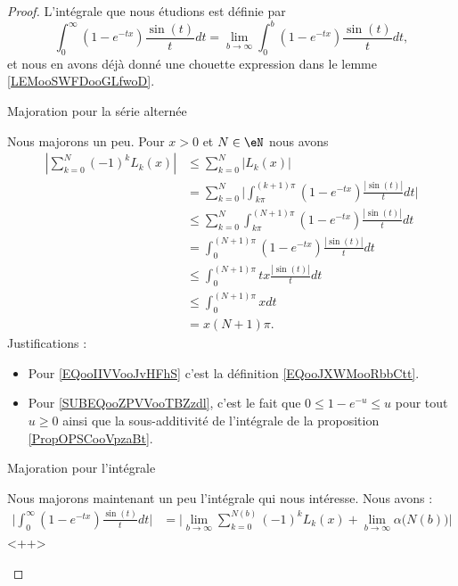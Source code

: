 \begin{proof}
    L'intégrale que nous étudions est définie par
    \begin{equation}
        \int_0^{\infty}(1- e^{-tx})\frac{ \sin(t) }{ t }dt=\lim_{b\to \infty} \int_0^b(1- e^{-tx})\frac{ \sin(t) }{ t }dt,
    \end{equation}
    et nous en avons déjà donné une chouette expression dans le lemme \ref{LEMooSWFDooGLfwoD}.

    \begin{subproof}
        \item[Majoration pour la série alternée]

            Nous majorons un peu. Pour \( x>0\) et \( N\in \eN\) nous avons
            \begin{subequations}
                \begin{align}
                    | \sum_{k=0}^N(-1)^kL_k(x) |&\leq \sum_{k=0}^N| L_k(x) |\\
                    &=\sum_{k=0}^N\big|   \int_{k\pi}^{(k+1)\pi}(1- e^{-tx})\frac{ | \sin(t) | }{ t }dt   \big| \label{EQooIIVVooJvHFhS}\\
                    &\leq \sum_{k=0}^N\int_{k\pi}^{(N+1)\pi}(1- e^{-tx})\frac{ | \sin(t) | }{ t }dt\\
                    &=\int_0^{(N+1)\pi}(1- e^{-tx})\frac{ | \sin(t) | }{ t }dt\\
                    &\leq \int_0^{(N+1)\pi}tx\frac{ | \sin(t) | }{ t }dt    \label{SUBEQooZPVVooTBZzdl}\\
                    &\leq \int_0^{(N+1)\pi}xdt\\
                    &=x(N+1)\pi.
                \end{align}
            \end{subequations}
            Justifications :
            \begin{itemize}
                \item Pour \eqref{EQooIIVVooJvHFhS} c'est la définition \eqref{EQooJXWMooRbbCtt}.
                \item Pour \eqref{SUBEQooZPVVooTBZzdl}, c'est le fait que \( 0\leq 1- e^{-u}\leq u\) pour tout \( u\geq 0\) ainsi que la sous-additivité de l'intégrale de la proposition \ref{PropOPSCooVpzaBt}.
            \end{itemize}

        \item[Majoration pour l'intégrale]
            
            Nous majorons maintenant un peu l'intégrale qui nous intéresse. Nous avons :
            \begin{subequations}
                \begin{align}
                    \big| \int_0^{\infty}(1- e^{-tx})\frac{ \sin(t) }{ t }dt \big|&=\big| \lim_{b\to \infty}\sum_{k=0}^{N(b)}(-1)^kL_k(x)+\lim_{b\to \infty} \alpha\big( N(b) \big)  \big|
                \end{align}
            \end{subequations}
            <++>


\end{subproof}
\end{proof}
